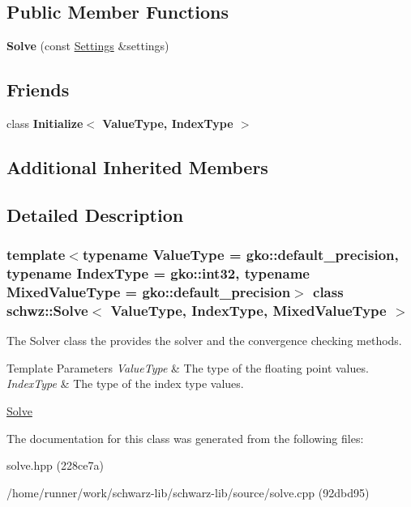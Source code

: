 \subsection*{Public Member Functions}
\begin{DoxyCompactItemize}
\item 
\mbox{\label{classschwz_1_1Solve_a667e6b9674ec54bb95152c8f263f1467}} 
{\bfseries Solve} (const \hyperlink{structschwz_1_1Settings}{Settings} \&settings)
\end{DoxyCompactItemize}
\subsection*{Friends}
\begin{DoxyCompactItemize}
\item 
\mbox{\label{classschwz_1_1Solve_a7044b349fe5363eeace2d1a56b38f650}} 
class {\bfseries Initialize$<$ Value\+Type, Index\+Type $>$}
\end{DoxyCompactItemize}
\subsection*{Additional Inherited Members}


\subsection{Detailed Description}
\subsubsection*{template$<$typename Value\+Type = gko\+::default\+\_\+precision, typename Index\+Type = gko\+::int32, typename Mixed\+Value\+Type = gko\+::default\+\_\+precision$>$\newline
class schwz\+::\+Solve$<$ Value\+Type, Index\+Type, Mixed\+Value\+Type $>$}

The Solver class the provides the solver and the convergence checking methods. 


\begin{DoxyTemplParams}{Template Parameters}
{\em Value\+Type} & The type of the floating point values. \\
\hline
{\em Index\+Type} & The type of the index type values.\\
\hline
\end{DoxyTemplParams}
\hyperlink{group__solve}{Solve} 

The documentation for this class was generated from the following files\+:\begin{DoxyCompactItemize}
\item 
solve.\+hpp (228ce7a)\item 
/home/runner/work/schwarz-\/lib/schwarz-\/lib/source/solve.\+cpp (92dbd95)\end{DoxyCompactItemize}
